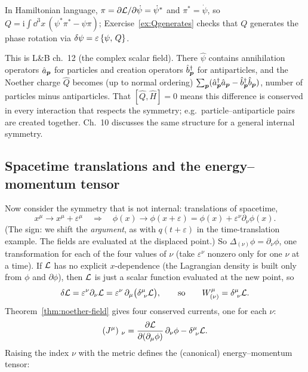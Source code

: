 \documentclass[11pt]{article}
\newcommand{\eps}{\varepsilon}
\begin{document}
In Hamiltonian language, $\pi=\partial\mathcal{L}/\partial\dot\psi=\dot\psi^*$ and $\pi^*=\dot\psi$, so $Q=\mathrm i\int\dd^3x\,(\psi^*\pi^*-\psi\pi)$; Exercise~\ref{ex:Qgenerates} checks that $Q$ generates the phase rotation via $\delta\psi=\eps\pb{\psi}{Q}$.

\begin{qftbridge}
This is L\&B ch.~12 (the complex scalar field). There $\hat\psi$ contains annihilation operators $\hat a_{\bm{p}}$ for particles and creation operators $\hat b^\dagger_{\bm{p}}$ for antiparticles, and the Noether charge $\hat Q$ becomes (up to normal ordering) $\sum_{\bm{p}}(\hat a^\dagger_{\bm{p}}\hat a_{\bm{p}}-\hat b^\dagger_{\bm{p}}\hat b_{\bm{p}})$, number of particles minus antiparticles. That $[\hat Q,\hat H]=0$ means this difference is conserved in every interaction that respects the symmetry; e.g.\ particle--antiparticle pairs are created together. Ch.~10 discusses the same structure for a general internal symmetry.
\end{qftbridge}

\subsection{Spacetime translations and the energy--momentum tensor}

Now consider the symmetry that is not internal: translations of spacetime,
\begin{equation}
  x^\mu\to x^\mu+\eps^\mu\quad\Longrightarrow\quad \phi(x)\to\phi(x+\eps)=\phi(x)+\eps^\nu\partial_\nu\phi(x) .
\end{equation}
(The sign: we shift the \emph{argument}, as with $q(t+\eps)$ in the time-translation example. The fields are evaluated at the displaced point.) So $\Delta_{(\nu)}\phi=\partial_\nu\phi$, one transformation for each of the four values of $\nu$ (take $\eps^\nu$ nonzero only for one $\nu$ at a time). If $\mathcal{L}$ has no explicit $x$-dependence (the Lagrangian density is built only from $\phi$ and $\partial\phi$), then $\mathcal{L}$ is just a scalar function evaluated at the new point, so
\begin{equation}
  \delta\Lag=\eps^\nu\partial_\nu\Lag=\eps^\nu\,\partial_\mu\big(\delta^\mu_{\ \nu}\Lag\big),\qquad\text{so}\qquad W^\mu_{(\nu)}=\delta^\mu_{\ \nu}\Lag .
\end{equation}
Theorem~\ref{thm:noether-field} gives four conserved currents, one for each $\nu$:
\begin{equation}
  (J^\mu)_{\ \nu}=\pdiff{\Lag}{(\partial_\mu\phi)}\,\partial_\nu\phi-\delta^\mu_{\ \nu}\Lag .
\end{equation}
Raising the index $\nu$ with the metric defines the (canonical) energy--momentum tensor:
\end{document}
